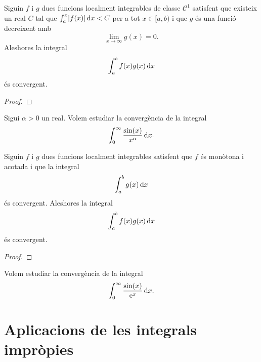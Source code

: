 \documentclass[../../Main.tex]{subfiles}
\begin{document}
	\begin{theorem}
		\label{thm:criteri de Dirichlet per integrals impròpies}
		Siguin \(f\) i \(g\) dues funcions localment integrables de classe \(\mathcal{C}^{1}\) satisfent que existeix un real \(C\) tal que \(\int_{a}^{x}\abs{f(x)}\diff x<C\) per a tot \(x\in[a,b)\) i que \(g\) és una funció decreixent amb
		\[\lim_{x\to\infty}g(x)=0.\]
		Aleshores la integral
		\[\int_{a}^{b}f(x)g(x)\mathop{}\!\mathrm{d} x\]
		és convergent.
		\begin{proof}
		\end{proof}
	\end{theorem}
	\begin{example}
		Sigui \(\alpha>0\) un real. Volem estudiar la convergència de la integral
		\[\int_{0}^{\infty}\frac{\sin(x)}{x^{\alpha}}\mathop{}\!\mathrm{d} x.\]
		\begin{solution}
		\end{solution}
	\end{example}
	\begin{theorem}
		\label{thm:criteri d'Abel per integrals impròpies}
		Siguin \(f\) i \(g\) dues funcions localment integrables satisfent que \(f\) és monòtona i acotada i que la integral
		\[\int_{a}^{b}g(x)\mathop{}\!\mathrm{d} x\]
		és convergent. Aleshores la integral
		\[\int_{a}^{b}f(x)g(x)\mathop{}\!\mathrm{d} x\]
		és convergent.
		\begin{proof}
		\end{proof}
	\end{theorem}
	\begin{example}
		\label{ex:criteri d'Abel per integrals impròpies}
		Volem estudiar la convergència de la integral
		\[\int_{0}^{\infty}\frac{\sin(x)}{\mathrm{e}^{x}}\mathop{}\!\mathrm{d} x.\]
		\begin{solution}
		\end{solution}
	\end{example}
\section{Aplicacions de les integrals impròpies}
\end{document}
